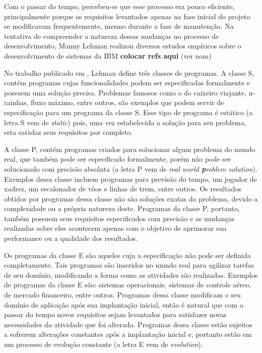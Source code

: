 \documentclass[a4paper, 12pt, twoside]{book}
\begin{document}
        Com o passar do tempo, percebeu-se que esse processo era pouco eficiente, 
        principalmente porque os requisitos levantados apenas na fase inicial do projeto se 
        modificavam frequentemente, mesmo durante a fase de manutenção. Na tentativa de compreender
        a natureza dessas mudanças no processo de desenvolvimento, Manny Lehman realizou diversos 
        estudos empíricos sobre o desenvolvimento de sistemas da IBM \textbf{colocar refs aqui} 
        (ver nom\cite{DBLP:series/springer/Mens08})
        
        No trabalho publicado em \cite{Lehman1980b}, Lehman define três classes de programas.
        A classe S, contém programas cujas funcionalidades podem ser especificadas formalmente e possuem uma 
        solução precisa. Problemas famosos como o do caixeiro viajante, n-rainhas, fluxo máximo, entre outros,
        são exemplos que podem servir de especificação para um programa da classe S. Esse 
        tipo de programa é estático (a letra S vem de \textit{static}) pois, uma vez estabelecida a 
        solução para seu problema, esta satisfaz seus requisitos por completo.
        
        A classe P, contém programas criados para solucionar algum problema do mundo real, que também  pode ser 
        especificado formalmente, porém não pode ser solucionado com precisão absoluta (a letra P 
        vem de \textit{real world \textbf{p}roblem solution}). Exemplos
        dessa classe incluem programas para previsão do tempo, um jogador de xadrez, um 
        escalonador de vôos e linhas de trem, entre outros. Os resultados obtidos por programas dessa
        classe não são soluções exatas do problema, devido a complexidade ou a própria natureza deste.
        Programas da classe P, portanto, também possuem seus requisitos especificados com precisão e 
        as mudanças realizadas sobre eles acontecem apenas com o objetivo de aprimorar sua performance ou a qualidade dos resultados.
        
        Os programas da classe E são aqueles cuja a especificação não pode ser definida completamente.
        Tais programas são inseridos no mundo real para agilizar tarefas de seu domínio, modificando 
        a forma como as atividades são realizadas. Exemplos de programas da classe E são: sistemas 
        operacionais, sistemas de controle aéreo, de mercado financeiro, entre outros. Programas 
        dessa classe modificam o seu domínio de aplicação após sua implantação inicial, então é 
        natural que com o passar do tempo novos requisitos sejam levantados para satisfazer 
        novas necessidades da atividade que foi alterada. Programas dessa classe estão
        sujeitos a sofrerem alterações constantes após a implantação inicial e, portanto estão
        em um processo de evolução constante (a letra E vem de \textit{evolution}).
        
\end{document}
